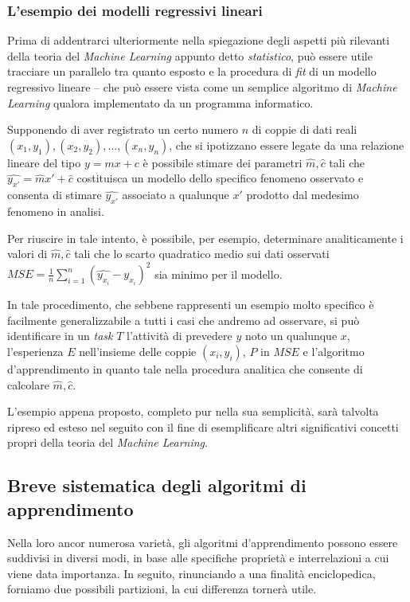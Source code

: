 \documentclass[a4paper, twoside]{article}
\begin{document}
\subsubsection{L'esempio dei modelli regressivi lineari}

Prima di addentrarci ulteriormente nella spiegazione degli aspetti più rilevanti della teoria del \textit{Machine Learning} appunto detto \textit{statistico}, può essere utile tracciare un parallelo tra quanto esposto e la procedura di \textit{fit} di un modello regressivo lineare -- che può essere vista come un semplice algoritmo di \textit{Machine Learning} qualora implementato da un programma informatico.

Supponendo di aver registrato un certo numero $n$ di coppie di dati reali $(x_1, y_1), (x_2, y_2), \dots,(x_n, y_n)$, che si ipotizzano essere legate da una relazione lineare del tipo $y = mx + c$ è possibile stimare dei parametri $\hat{m}, \hat{c}$ tali che $\hat{y_{x'}} = \hat{m}x' + \hat{c}$ costituisca un modello dello specifico fenomeno osservato e consenta di stimare $\hat{y_{x'}}$ associato a qualunque $x'$ prodotto dal medesimo fenomeno in analisi.

Per riuscire in tale intento, è possibile, per esempio, determinare analiticamente i valori di $\hat{m}, \hat{c}$ tali che lo scarto quadratico medio sui dati osservati $MSE = \frac{1}{n}\sum_{i=1}^{n}{(\hat{y_{x_i}} - y_{x_i})^2}$ sia minimo per il modello.

In tale procedimento, che sebbene rappresenti un esempio molto specifico è facilmente generalizzabile a tutti i casi che andremo ad osservare, si può identificare in un \textit{task} $T$ l'attività di prevedere $y$ noto un qualunque $x$, l'esperienza $E$ nell'insieme delle coppie $(x_i, y_i)$, $P$ in $MSE$ e l'algoritmo d'apprendimento in quanto tale nella procedura analitica che consente di calcolare $\hat{m}, \hat{c}$.

L'esempio appena proposto, completo pur nella sua semplicità, sarà talvolta ripreso ed esteso nel seguito con il fine di esemplificare altri significativi concetti propri della teoria del \textit{Machine Learning}.


\subsection{Breve sistematica degli algoritmi di apprendimento}

Nella loro ancor numerosa varietà, gli algoritmi d'apprendimento possono essere suddivisi in diversi modi, in base alle specifiche proprietà e interrelazioni a cui viene data importanza. In seguito, rinunciando a una finalità enciclopedica, forniamo due possibili partizioni, la cui differenza tornerà utile.
\end{document}
